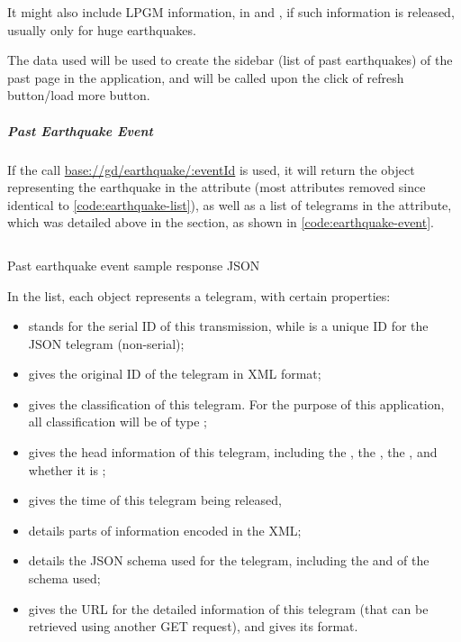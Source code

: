 It might also include LPGM information, in  and , if such information is released, usually only for huge earthquakes.

The data used will be used to create the sidebar (list of past earthquakes) of the past page in the application, and will be called upon the click of refresh button/load more button.

\subparagraph{Past Earthquake Event} If the call \url{base://gd/earthquake/:eventId} is used, it will return the object representing the earthquake in the  attribute (most attributes removed since identical to \autoref{code:earthquake-list}), as well as a list of telegrams in the  attribute, which was detailed above in the  section, as shown in \autoref{code:earthquake-event}.

\begin{listing}[htp]
    \inputminted{json}{code/GdEarthquakeEvent.json}
    \caption{Past earthquake event sample response JSON}
    \label{code:earthquake-event}
\end{listing}

In the  list, each object represents a telegram, with certain properties:
\begin{itemize}
    \item {} stands for the serial ID of this transmission, while  is a unique ID for the JSON telegram (non-serial);
    \item {} gives the original ID of the telegram in XML format;
    \item {} gives the classification of this telegram. For the purpose of this application, all classification will be of type ;
    \item {} gives the head information of this telegram, including the , the , the , and whether it is ;
    \item {} gives the time of this telegram being released,
    \item {} details parts of information encoded in the XML;
    \item {} details the JSON schema used for the telegram, including the  and  of the schema used;
    \item {} gives the URL for the detailed information of this telegram (that can be retrieved using another GET request), and  gives its format.
\end{itemize}

